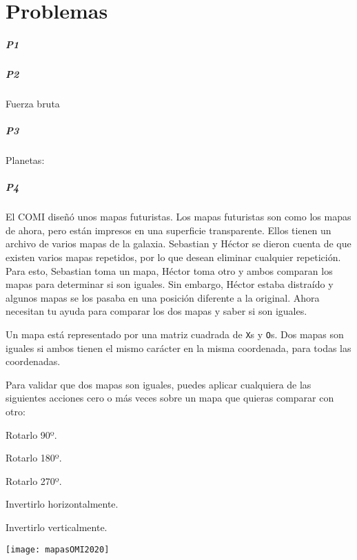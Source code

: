 \chapter*{Problemas}
 \paragraph{P1}  
 
 \problembreak
 
 \paragraph{P2} Fuerza bruta
 
 \problembreak
 
 \paragraph{P3} Planetas: 
 
 
 
  \problembreak
  
 \paragraph{P4} El COMI diseñó unos mapas futuristas. Los mapas futuristas son como los mapas de ahora, pero están impresos en una superficie transparente. Ellos tienen un archivo de varios mapas de la galaxia. Sebastian y Héctor se dieron cuenta de que existen varios mapas repetidos, por lo que desean eliminar cualquier repetición. Para esto, Sebastian toma un mapa, Héctor toma otro y ambos comparan los mapas para determinar si son iguales. Sin embargo, Héctor estaba distraído y algunos mapas se los pasaba en una posición diferente a la original. Ahora necesitan tu ayuda para comparar los dos mapas y saber si son iguales.
 
 Un mapa está representado por una matriz cuadrada de \verb|X|s y \verb|O|s. Dos mapas son iguales si ambos tienen el mismo carácter en la misma coordenada, para todas las coordenadas.
 
 Para validar que dos mapas son iguales, puedes aplicar cualquiera de las siguientes acciones cero o más veces sobre un mapa que quieras comparar con otro:
 \begin{plimits}
 	\item Rotarlo 90º.
 	\item Rotarlo 180º.
 	\item Rotarlo 270º.
 	\item Invertirlo horizontalmente.
 	\item Invertirlo verticalmente.
 \end{plimits}
 \begin{center}
 	\texttt{[image: mapasOMI2020]}
 \end{center}
 
